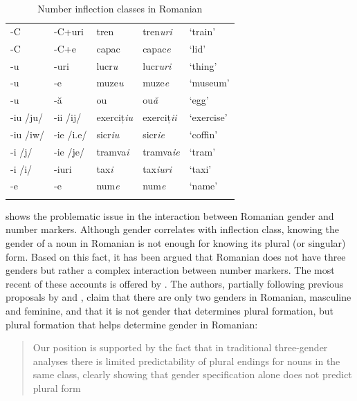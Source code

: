 \begin{table}[!htbp]
\begin{tabular}{lllll}
    -C         & -C+uri     & tren      & tren\textit{uri}   & `train'          \\
    -C         & -C+e       & capac     & capac\textit{e}    & `lid'            \\
    -u         & -uri       & lucr\textit{u}     & lucr\textit{uri}   & `thing'          \\
    -u         & -e         & muze\textit{u}     & muze\textit{e}     & `museum'         \\
    -u         & -ă         & ou        & ou\textit{ă}       & `egg'            \\
    -iu /ju/   & -ii /ij/   & exerciț\textit{iu} & exerciț\textit{ii} & `exercise'       \\
    -iu /iw/   & -ie /i.e/  & sicr\textit{iu}    & sicr\textit{ie}    & `coffin'         \\
    -i  /j/    & -ie /je/   & tramva\textit{i}   & tramva\textit{ie}  & `tram'           \\
    -i  /i/    & -iuri      & tax\textit{i}      & tax\textit{iuri}   & `taxi'           \\
    -e         & -e         & num\textit{e}      & num\textit{e}      & `name'           \\
    \lspbottomrule
  \end{tabular}\caption{Number inflection classes in Romanian}\label{tab:romanian-plural-clases}
\end{table}

 shows the problematic issue in the interaction between Romanian gender and number markers. Although gender correlates with inflection class, knowing the gender of a noun in Romanian is not enough for knowing its plural (or singular) form. Based on this fact, it has been argued that Romanian does not have three genders but rather a complex interaction between number markers. The most recent of these accounts is offered by \textcite{Bateman.2010}. The authors, partially following previous proposals by \textcite{Hall.1965} and \textcite{Farkas.1995}, claim that there are only two genders in Romanian, masculine and feminine, and that it is not gender that determines plural formation, but plural formation that helps determine gender in Romanian:

\nocite{Gerdts.2010} %

\begin{quotation}
Our position is supported by the fact that in traditional three-gender analyses there is limited predictability of plural endings for nouns in the same class, clearly showing that gender specification alone does not predict plural form \autocite[53]{Bateman.2010}
\end{quotation}

